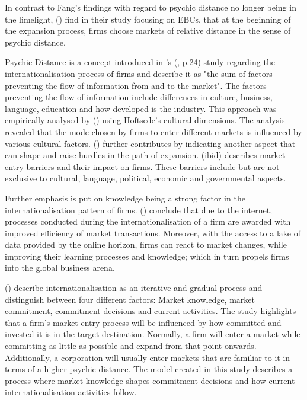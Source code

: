 \documentclass[11pt,a4paper]{article}
\begin{document}
In contrast to Fang's findings with regard to psychic distance no longer being in the limelight, \citeauthor{forsgrenIgnorantImpatientInternationalization2007} (\citeyear{forsgrenIgnorantImpatientInternationalization2007})  find in their study focusing on EBCs, that at the beginning of the expansion process, firms choose markets of relative distance in the sense of psychic distance. \par
Psychic Distance is a concept introduced in \citeauthor{johansonInternationalizationProcessFirm1977}'s (\citeyear{johansonInternationalizationProcessFirm1977}, p.24) study regarding the internationalisation process of firms and describe it as "the sum of factors preventing the flow of information from and to the market". The factors preventing the flow of information include differences in culture, business, language, education and how developed is the industry.  This approach was empirically analysed by \citeauthor{kogutEffectNationalCulture1988} (\citeyear{kogutEffectNationalCulture1988}) using Hoftsede's cultural dimensions. The analysis revealed that the mode chosen by firms to enter different markets is influenced by various cultural factors. 
\citeauthor{karakayaBarriersEntryInternational1993} (\citeyear{karakayaBarriersEntryInternational1993}) further contributes  by indicating another aspect that can shape and raise hurdles in the path of expansion. \citeauthor{karakayaBarriersEntryInternational1993} (ibid) describes market entry barriers and their impact on firms. These barriers include but are not exclusive to cultural, language, political, economic and governmental aspects. \par
Further emphasis is put on knowledge being a strong factor in the internationalisation pattern of firms. \citeauthor{petersenInternetForeignMarket2002} (\citeyear{petersenInternetForeignMarket2002}) conclude that due to the internet, processes conducted during the internationalisation of a firm are awarded with improved efficiency of market transactions. Moreover, with the access to a lake of data provided by the online horizon, firms can react to market changes, while improving their learning processes and knowledge; which in turn propels firms into the global business arena. \par 
\citeauthor{johansonInternationalizationProcessFirm1977} (\citeyear{johansonInternationalizationProcessFirm1977}) describe internationalisation as an iterative and gradual process and distinguish between four different factors: Market knowledge, market commitment, commitment decisions and current activities. The study highlights that a firm's market entry process will be influenced by how committed and invested it is in the target destination. Normally, a firm will enter a market while committing as little as possible and expand from that point onwards. Additionally, a corporation will usually enter markets that are familiar to it in terms of a higher psychic distance. The model created in this study describes a process where market knowledge shapes commitment decisions and how current internationalisation activities follow.  \par
\end{document}
